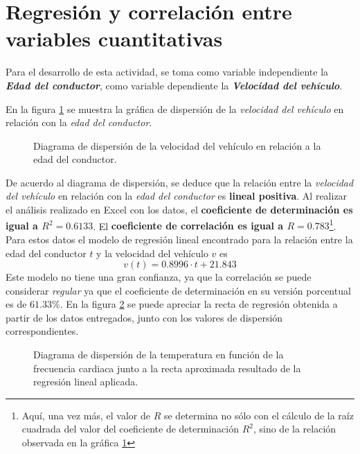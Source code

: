 \section*{Regresión y correlación entre variables cuantitativas}
Para el desarrollo de esta actividad, se toma como variable independiente la \textbf{\emph{Edad del conductor}}, como variable dependiente la \textbf{\emph{Velocidad del vehículo}}.\par
En la figura \ref{fig:scatterPlotExercise} se muestra la gráfica de dispersión de la \emph{velocidad del vehículo} en relación con la \emph{edad del conductor}.
\begin{figure}[!ht]
    \centering
    
    \caption{\footnotesize{Diagrama de dispersión de la velocidad del vehículo en relación a la edad del conductor.}}
    \label{fig:scatterPlotExercise}
\end{figure}
De acuerdo al diagrama de dispersión, se deduce que la relación entre la \emph{velocidad del vehículo} en relación con la \emph{edad del conductor} es \textbf{lineal positiva}.
Al realizar el análisis realizado en Excel con los datos, el \textbf{coeficiente de determinación es igual a $R^{2}=0.6133$}. El \textbf{coeficiente de correlación es igual a $R=0.783$}\footnote[1]{Aquí, una vez más, el valor de $R$ se determina no sólo con el cálculo de la raíz cuadrada del valor del coeficiente de determinación $R^{2}$, sino de la relación observada en la gráfica \ref{fig:scatterPlotExercise}}. Para estos datos el modelo de regresión lineal encontrado para la relación entre la edad del conductor $t$ y la velocidad del vehículo $v$ es
\begin{equation*}
    v(t) = 0.8996\cdot t + 21.843
\end{equation*}
Este modelo no tiene una gran confianza, ya que la correlación se puede considerar \emph{regular} ya que el coeficiente de determinación en su versión porcentual es de $61.33\%$. En la figura \ref{fig:scatterPlotExerciseb} se puede apreciar la recta de regresión obtenida a partir de los datos entregados, junto con los valores de dispersión correspondientes.\par
\begin{figure}[!ht]
    \centering
    
    \caption{\footnotesize{Diagrama de dispersión de la temperatura en función de la frecuencia cardiaca junto a la recta aproximada resultado de la regresión lineal aplicada.}}
    \label{fig:scatterPlotExerciseb}
\end{figure}